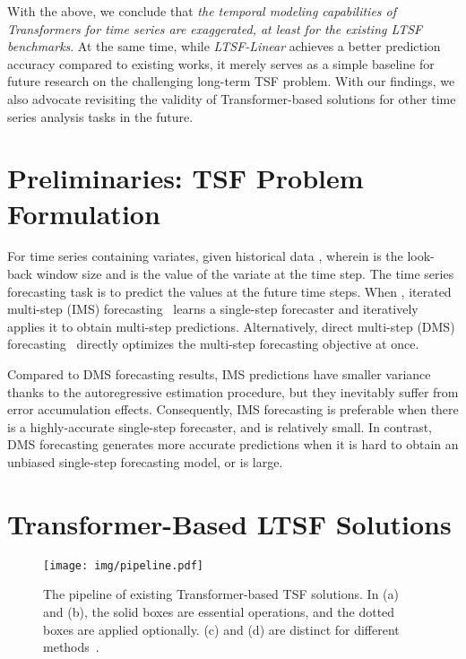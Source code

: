 \documentclass[10pt,twocolumn,letterpaper]{article}
\newcommand{\modelname}{\emph{LTSF-Linear}\xspace}
\begin{document}
With the above, we conclude that \emph{the temporal modeling capabilities of Transformers for time series are exaggerated, at least for the existing LTSF benchmarks}. At the same time, while \modelname achieves a better prediction accuracy compared to existing works, it merely serves as a simple baseline for future research on the challenging long-term TSF problem. With our findings, we also advocate revisiting the validity of Transformer-based solutions for other time series analysis tasks in the future.

 \section{Preliminaries: TSF Problem Formulation}
\label{sec:related}

\label{sec:pre_problem}
For time series containing  variates, given historical data , wherein  is the look-back window size and   is the value of the  variate at the  time step. The time series forecasting task is to predict the values  at the  future time steps. 
When , iterated multi-step (IMS) forecasting~\cite{taieb2012recursive} learns a single-step forecaster and iteratively applies it to obtain multi-step predictions. Alternatively, direct multi-step (DMS) forecasting~\cite{chevillon2007direct} directly optimizes the multi-step forecasting objective at once. 


Compared to DMS forecasting results, IMS predictions have smaller variance thanks to the autoregressive estimation procedure, but they inevitably suffer from error accumulation effects. Consequently, IMS forecasting is preferable when there is a highly-accurate single-step forecaster, and  is relatively small. In contrast, DMS forecasting generates more accurate predictions when it is hard to obtain an unbiased single-step forecasting model, or  is large. 




 \section{Transformer-Based LTSF Solutions}
\label{sec:trans}


\begin{figure*}[t]
\vspace{-0.2cm}
\begin{center}
\texttt{[image: img/pipeline.pdf]}
\end{center}
\vspace{-0.4cm}
\caption{The pipeline of existing Transformer-based TSF solutions. In (a) and (b), the solid boxes are essential operations, and the dotted boxes are applied optionally. (c) and (d) are distinct for different methods~\cite{li2019LogTrans,informer,xu2021autoformer,liu2021pyraformer,zhou2022fedformer}.}
\vspace{-0.6cm}
\label{fig:pipeline}
\end{figure*}
\end{document}
